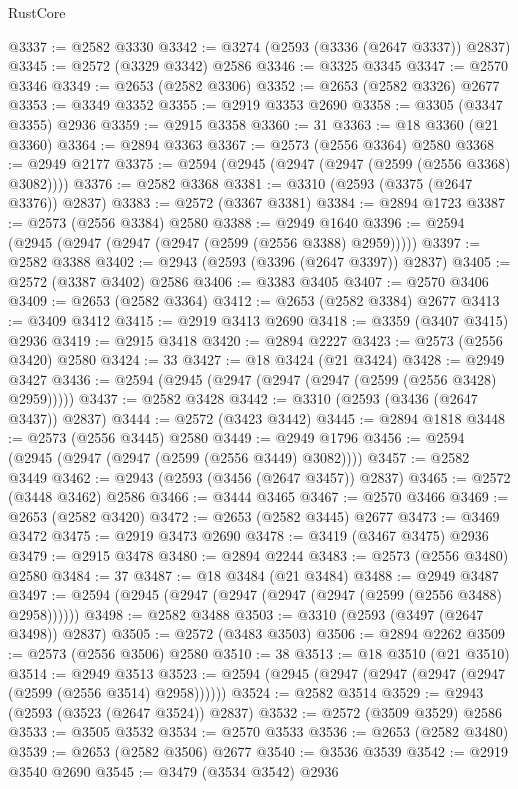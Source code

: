 \begin{lexlean}{RustCore}
\begin{coremodule}
@3337 := @2582 @3330
@3342 := @3274 (@2593 (@3336 (@2647 @3337)) @2837)
@3345 := @2572 (@3329 @3342) @2586
@3346 := @3325 @3345
@3347 := @2570 @3346
@3349 := @2653 (@2582 @3306)
@3352 := @2653 (@2582 @3326) @2677
@3353 := @3349 @3352
@3355 := @2919 @3353 @2690
@3358 := @3305 (@3347 @3355) @2936
@3359 := @2915 @3358
@3360 := 31
@3363 := @18 @3360 (@21 @3360)
@3364 := @2894 @3363
@3367 := @2573 (@2556 @3364) @2580
@3368 := @2949 @2177
@3375 := @2594 (@2945 (@2947 (@2947 (@2599 (@2556 @3368) @3082))))
@3376 := @2582 @3368
@3381 := @3310 (@2593 (@3375 (@2647 @3376)) @2837)
@3383 := @2572 (@3367 @3381)
@3384 := @2894 @1723
@3387 := @2573 (@2556 @3384) @2580
@3388 := @2949 @1640
@3396 := @2594 (@2945 (@2947 (@2947 (@2947 (@2599 (@2556 @3388) @2959)))))
@3397 := @2582 @3388
@3402 := @2943 (@2593 (@3396 (@2647 @3397)) @2837)
@3405 := @2572 (@3387 @3402) @2586
@3406 := @3383 @3405
@3407 := @2570 @3406
@3409 := @2653 (@2582 @3364)
@3412 := @2653 (@2582 @3384) @2677
@3413 := @3409 @3412
@3415 := @2919 @3413 @2690
@3418 := @3359 (@3407 @3415) @2936
@3419 := @2915 @3418
@3420 := @2894 @2227
@3423 := @2573 (@2556 @3420) @2580
@3424 := 33
@3427 := @18 @3424 (@21 @3424)
@3428 := @2949 @3427
@3436 := @2594 (@2945 (@2947 (@2947 (@2947 (@2599 (@2556 @3428) @2959)))))
@3437 := @2582 @3428
@3442 := @3310 (@2593 (@3436 (@2647 @3437)) @2837)
@3444 := @2572 (@3423 @3442)
@3445 := @2894 @1818
@3448 := @2573 (@2556 @3445) @2580
@3449 := @2949 @1796
@3456 := @2594 (@2945 (@2947 (@2947 (@2599 (@2556 @3449) @3082))))
@3457 := @2582 @3449
@3462 := @2943 (@2593 (@3456 (@2647 @3457)) @2837)
@3465 := @2572 (@3448 @3462) @2586
@3466 := @3444 @3465
@3467 := @2570 @3466
@3469 := @2653 (@2582 @3420)
@3472 := @2653 (@2582 @3445) @2677
@3473 := @3469 @3472
@3475 := @2919 @3473 @2690
@3478 := @3419 (@3467 @3475) @2936
@3479 := @2915 @3478
@3480 := @2894 @2244
@3483 := @2573 (@2556 @3480) @2580
@3484 := 37
@3487 := @18 @3484 (@21 @3484)
@3488 := @2949 @3487
@3497 := @2594 (@2945 (@2947 (@2947 (@2947 (@2947 (@2599 (@2556 @3488) @2958))))))
@3498 := @2582 @3488
@3503 := @3310 (@2593 (@3497 (@2647 @3498)) @2837)
@3505 := @2572 (@3483 @3503)
@3506 := @2894 @2262
@3509 := @2573 (@2556 @3506) @2580
@3510 := 38
@3513 := @18 @3510 (@21 @3510)
@3514 := @2949 @3513
@3523 := @2594 (@2945 (@2947 (@2947 (@2947 (@2947 (@2599 (@2556 @3514) @2958))))))
@3524 := @2582 @3514
@3529 := @2943 (@2593 (@3523 (@2647 @3524)) @2837)
@3532 := @2572 (@3509 @3529) @2586
@3533 := @3505 @3532
@3534 := @2570 @3533
@3536 := @2653 (@2582 @3480)
@3539 := @2653 (@2582 @3506) @2677
@3540 := @3536 @3539
@3542 := @2919 @3540 @2690
@3545 := @3479 (@3534 @3542) @2936

\end{coremodule}
\end{lexlean}

